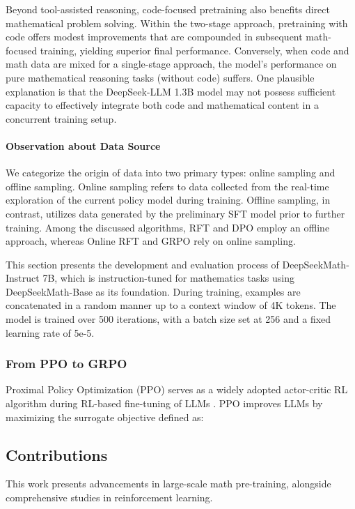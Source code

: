 \begin{itemize}[topsep=0pt]
\begin{itemize}[topsep=0pt]
Beyond tool-assisted reasoning, code-focused pretraining also benefits direct mathematical problem solving. Within the two-stage approach, pretraining with code offers modest improvements that are compounded in subsequent math-focused training, yielding superior final performance. Conversely, when code and math data are mixed for a single-stage approach, the model’s performance on pure mathematical reasoning tasks (without code) suffers. One plausible explanation is that the DeepSeek-LLM 1.3B model may not possess sufficient capacity to effectively integrate both code and mathematical content in a concurrent training setup.

\paragraph{Observation about Data Source} We categorize the origin of data into two primary types: online sampling and offline sampling. Online sampling refers to data collected from the real-time exploration of the current policy model during training. Offline sampling, in contrast, utilizes data generated by the preliminary SFT model prior to further training. Among the discussed algorithms, RFT and DPO employ an offline approach, whereas Online RFT and GRPO rely on online sampling.

This section presents the development and evaluation process of DeepSeekMath-Instruct 7B, which is instruction-tuned for mathematics tasks using DeepSeekMath-Base as its foundation. During training, examples are concatenated in a random manner up to a context window of 4K tokens. The model is trained over 500 iterations, with a batch size set at 256 and a fixed learning rate of 5e-5.

\subsubsection{From PPO to GRPO} Proximal Policy Optimization (PPO) \citep{schulman2017proximal} serves as a widely adopted actor-critic RL algorithm during RL-based fine-tuning of LLMs \citep{ouyang2022training}. PPO improves LLMs by maximizing the surrogate objective defined as:

\subsection{Contributions}
This work presents advancements in large-scale math pre-training, alongside comprehensive studies in reinforcement learning.


\end{itemize}
\end{itemize}

